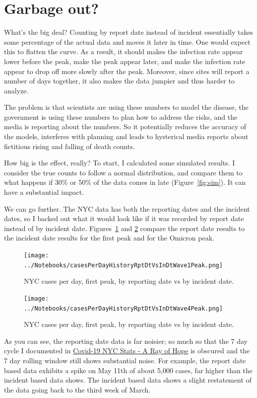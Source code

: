 \documentclass[10pt,reqno]{amsart}
\begin{document}
\section{Garbage out?}

What's the big deal?  Counting by report date instead of incident
essentially takes some percentage of the actual data and moves it
later in time.  One would expect this to flatten the curve.  As a
result, it should makes the infection rate appear lower before the
peak, make the peak appear later, and make the infection rate appear
to drop off more slowly after the peak.  Moreover, since sites will
report a number of days together, it also makes the data jumpier and
thus harder to analyze.

The problem is that scientists are using these numbers to model the
disease, the government is using these numbers to plan
how to address the risks, and the media is reporting about the
numbers.  So it potentially reduces the accuracy of the models, interferes with
planning and leads to hysterical media reports about fictitious rising
and falling of death counts.

How big is the effect, really?  To start, I calculated some simulated
results.  I consider the true counts to follow a normal distribution,
and compare them to what happens if 30\% or 50\% of the data comes in
late (Figure~\ref{fig:sim}).  It can have a substantial impact.

We can go further.  The NYC data has both the reporting dates
and the incident dates, so I backed out what it would look like if it
was recorded by report date instead of by incident
date. Figures~\ref{fig:peak1} and \ref{fig:omicron} compare the
report date results to the incident date results for the first peak
and for the Omicron peak.

\begin{figure}[!htb]
  \centering
  \texttt{[image: ../Notebooks/casesPerDayHistoryRptDtVsInDtWave1Peak.png]}
  \caption{NYC cases per day, first peak, by reporting date vs by
    incident date.}
  \label{fig:peak1}
\end{figure}

\begin{figure}[!htb]
  \centering
  \texttt{[image: ../Notebooks/casesPerDayHistoryRptDtVsInDtWave4Peak.png]}
  \caption{NYC cases per day, first peak, by reporting date vs by
    incident date.}
  \label{fig:omicron}
\end{figure}

As you can see, the reporting date data is far noisier; so much so
that the 7 day cycle I documented in
\href{https://hjstein.blogspot.com/2020/04/covid-19-nyc-stats-ray-of-hope.html}{Covid-19
  NYC Stats - A Ray of Hope} is obscured and the 7 day rolling window
still shows substantial noise.  For example, the report date based
data exhibits a spike on May 11th of about 5,000 cases, far higher than
the incident based data shows.  The incident based data shows a slight
restatement of the data going back to the third week of March.
\end{document}

